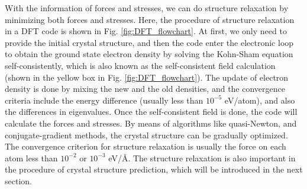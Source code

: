 With the information of forces and stresses, we can do structure relaxation by minimizing both forces and stresses. Here, the procedure of structure relaxation in a DFT code is shown in Fig.  \ref{fig:DFT_flowchart}. At first, we only need to provide the initial crystal structure, and then the code enter the electronic loop to obtain the ground state electron density by solving the Kohn-Sham equation self-consistently, which is also known as the self-consistent field calculation (shown in the yellow box in Fig. \ref{fig:DFT_flowchart}). The update of electron density is done by mixing the new and the old densities, and the convergence criteria include the energy difference (usually less than $10^{-5}$ eV/atom), and also the differences in eigenvalues. Once the self-consistent field is done, the code will calculate the forces and stresses. By means of algorithms like quasi-Newton, and conjugate-gradient methods, the crystal structure can be gradually optimized. The convergence criterion for structure relaxation is usually the force on each atom less than $10^{-2}$ or $10^{-3}$ eV/\AA. The structure relaxation is also important in the procedure of crystal structure prediction, which will be introduced in the next section.

